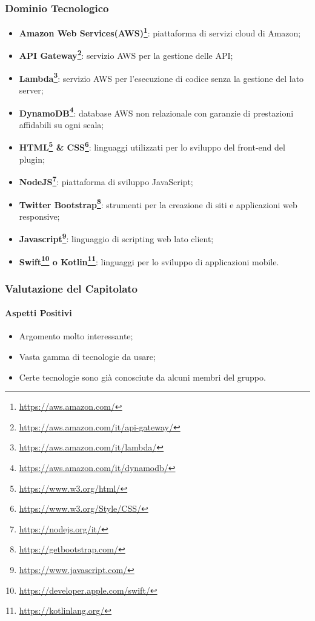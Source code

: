\subsubsection{Dominio Tecnologico}
\begin{itemize}
	\item \textbf{Amazon Web Services(AWS)\footnote{\hyperref[Link al sito]{https://aws.amazon.com/}}}: piattaforma di servizi cloud di Amazon;
	\item \textbf{API Gateway\footnote{\hyperref[Link al sito]{https://aws.amazon.com/it/api-gateway/}}}: servizio AWS per la gestione delle API;
	\item \textbf{Lambda\footnote{\hyperref[Link al sito]{https://aws.amazon.com/it/lambda/}}}: servizio AWS per l’esecuzione di codice senza la gestione del lato server;
	\item \textbf{DynamoDB\footnote{\hyperref[Link al sito]{https://aws.amazon.com/it/dynamodb/}}}: database AWS non relazionale con garanzie di prestazioni affidabili su ogni scala;
	\item \textbf{HTML\footnote{\hyperref[Link al sito]{https://www.w3.org/html/}} \& CSS\footnote{\hyperref[Link al sito]{https://www.w3.org/Style/CSS/}}}: linguaggi utilizzati per lo sviluppo del front-end del plugin;
	\item \textbf{NodeJS\footnote{\hyperref[Link al sito]{https://nodejs.org/it/}}}: piattaforma di sviluppo JavaScript;
	\item \textbf{Twitter Bootstrap\footnote{\hyperref[Link al sito]{https://getbootstrap.com/}}}: strumenti per la creazione di siti e applicazioni web responsive;
	\item \textbf{Javascript\footnote{\hyperref[Link al sito]{https://www.javascript.com/}}}: linguaggio di scripting web lato client;
	\item \textbf{Swift\footnote{\hyperref[Link al sito]{https://developer.apple.com/swift/}} o Kotlin\footnote{\hyperref[Link al sito]{https://kotlinlang.org/}}}: linguaggi per lo sviluppo di applicazioni mobile.
\end{itemize}

\subsubsection{Valutazione del Capitolato}
\paragraph{Aspetti Positivi}
\begin{itemize}
	\item Argomento molto interessante;
	\item Vasta gamma di tecnologie da usare;
	\item Certe tecnologie sono già conosciute da alcuni membri del gruppo.
\end{itemize}

